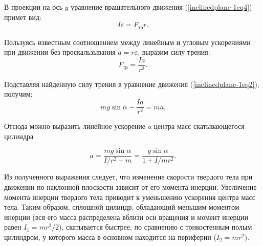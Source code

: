 \documentclass[All.tex]{subfiles}
\begin{document}
	В проекции на ось $ y $ уравнение вращательного  движения (\ref{inclinedplane-1eq4}) примет вид:
	\begin{equation}\label{inclinedplane-1eq5}
	I\varepsilon = F_{\text{тр}} r.
	\end{equation}
	 
	Пользуясь известным соотношением между линейным и угловым ускорениями при движении без проскальзывания $ a = r\varepsilon $, выразим силу трения:
	\begin{equation}\label{inclinedplane-1eq6}
	F_{\text{тр}} = \frac{Ia}{r^{2}}.
	\end{equation}

	Подставляя найденную силу трения в уравнение движения (\ref{inclinedplane-1eq2}), получим:
		\begin{equation}\label{inclinedplane-1eq7}
		mg\sin\alpha -  \frac{Ia}{r^{2}} = ma.
	\end{equation}
	
	Отсюда можно выразить линейное ускорение \textit{a} центра масс скатывающегося цилиндра  

	\begin{equation}\label{8}
	a =  \frac{mg\sin\alpha}{I/r^{2} + m}  = \frac{g\sin\alpha}{1 + I/mr^{2}}.
	\end{equation} 
	  
	  Из полученного выражения следует, что изменение скорости твердого тела при движении по наклонной плоскости зависит от его момента инерции.
	 Увеличение момента инерции твердого тела приводит к уменьшению ускорения центра масс тела.
	 Таким образом, сплошной цилиндр, обладающий меньшим моментом инерции (вся его масса распределена вблизи оси вращения и момент инерции равен $ I_{1} = mr^{2}/2 $), скатывается быстрее, по сравнению с тонкостенным полым цилиндром, у которого масса в основном находится на периферии ($ I_{2} = mr^{2}  $).    
	
\end{document}
